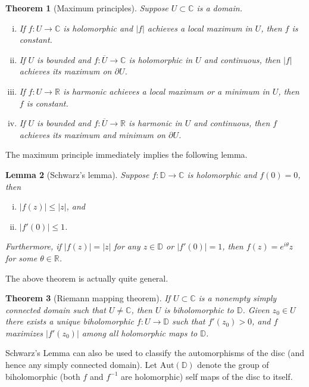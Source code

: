 \documentclass[12pt,openany]{book}
\newcommand{\sabs}[1]{\lvert {#1} \rvert}
\newcommand{\C}{{\mathbb{C}}}
\newcommand{\R}{{\mathbb{R}}}
\newcommand{\D}{{\mathbb{D}}}
\theoremstyle{plain}
\newtheorem{thm}{Theorem}[section]
\newtheorem{lemma}[thm]{Lemma}
\theoremstyle{remark}
\theoremstyle{definition}
\theoremstyle{exercise}
\theoremstyle{example}
\begin{document}
\begin{thm}[Maximum principles]
Suppose $U \subset \C$ is a domain.
\begin{enumerate}[(i)]
\item
If $f \colon U \to \C$ is holomorphic and $\sabs{f}$
achieves a local maximum in $U$, then $f$ is constant.
\item
If $U$ is bounded and $f \colon \overline{U} \to \C$ is holomorphic in $U$
and continuous, then $\sabs{f}$ achieves its maximum on $\partial U$.
\item
If $f \colon U \to \R$ is harmonic 
achieves a local maximum or a minimum in $U$, then $f$ is constant.
\item
If $U$ is bounded and $f \colon \overline{U} \to \R$ is harmonic in $U$
and continuous, then $f$ achieves its maximum and minimum on $\partial U$.
\end{enumerate}
\end{thm}

The maximum principle immediately implies the following lemma.

\pagebreak[2]
\begin{lemma}[Schwarz's lemma]
Suppose $f \colon \D \to \C$ is holomorphic and $f(0) = 0$,
then 
\begin{enumerate}[(i)]
\item $\sabs{f(z)} \leq \sabs{z}$, and
\item $\sabs{f'(0)} \leq 1$.
\end{enumerate}
Furthermore, if $\sabs{f(z)} = \sabs{z}$ for any $z \in \D$
or $\sabs{f'(0)} = 1$, then $f(z) =
e^{i\theta} z$ for some $\theta \in \R$.
\end{lemma}

The above theorem is actually quite general.

\begin{thm}[Riemann mapping theorem]
If $U \subset \C$ is a nonempty simply connected domain such that $U \neq \C$,
then $U$ is biholomorphic to $\D$.  Given $z_0 \in U$
there exists a unique biholomorphic $f \colon U \to \D$
such that $f'(z_0) > 0$, and $f$
maximizes $\sabs{f'(z_0)}$ among all holomorphic maps to $\D$.
\end{thm}

Schwarz's Lemma can also be used to classify the automorphisms of the disc
(and hence any simply connected domain).  Let
$\operatorname{Aut(\D)}$ denote the group of biholomorphic (both $f$ and
$f^{-1}$ are holomorphic) self maps of the
disc to itself.
\end{document}
